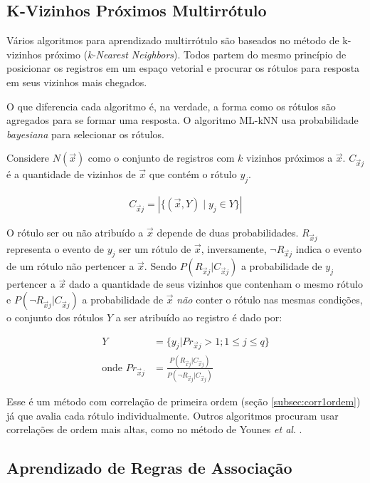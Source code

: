 \documentclass[runningheads,a4paper]{llncs}
\begin{document}
\subsection{K-Vizinhos Próximos Multirrótulo}\label{subsec:kvizinhos}

Vários algoritmos para aprendizado multirrótulo são baseados no método de k-vizinhos próximo (\textit{k-Nearest Neighbors}). Todos partem do mesmo princípio de posicionar os registros em um espaço vetorial e procurar os rótulos para resposta em seus vizinhos mais chegados.

O que diferencia cada algoritmo é, na verdade, a forma como os rótulos são agregados para se formar uma resposta. O algoritmo ML-kNN \cite{Zhang2007-id} usa probabilidade \textit{bayesiana} para selecionar os rótulos.

Considere $N(\vec{x})$ como o conjunto de registros com $k$ vizinhos próximos a $\vec{x}$. $C_{\vec{x}j}$ é a quantidade de vizinhos de $\vec{x}$ que contém o rótulo $y_j$.

\begin{align*}
C_{\vec{x}j} = |\{ (\vec{x}, Y) \mid y_j \in Y \}|
\end{align*}

O rótulo ser ou não atribuído a $\vec{x}$ depende de duas probabilidades. $R_{\vec{x}j}$ representa o evento de $y_j$ ser um rótulo de $\vec{x}$, inversamente, $\neg R_{\vec{x}j}$ indica o evento de um rótulo não pertencer a $\vec{x}$. Sendo $P(R_{\vec{x}j} | C_{\vec{x}j})$ a probabilidade de $y_j$ pertencer a $\vec{x}$ dado a quantidade de seus vizinhos que contenham o mesmo rótulo e $P(\neg R_{\vec{x}j} | C_{\vec{x}j})$ a probabilidade de $\vec{x}$ \textit{não} conter o rótulo nas mesmas condições, o conjunto dos rótulos $Y$ a ser atribuído ao registro é dado por:

\begin{align*}
Y &= \{ y_j | Pr_{\vec{x}j} > 1; 1 \leq j \leq q \} \\
\text{onde } Pr_{\vec{x}j} &= \frac{P( R_{\vec{x}j} | C_{\vec{x}j})}{P(\neg R_{\vec{x}j} | C_{\vec{x}j})}
\end{align*}

Esse é um método com correlação de primeira ordem (seção \ref{subsec:corr1ordem}) já que avalia cada rótulo individualmente. Outros algoritmos procuram usar correlações de ordem mais altas, como no método de Younes \textit{et al}. \cite{Younes2011-sf}.

\subsection{Aprendizado de Regras de Associação}
\end{document}
